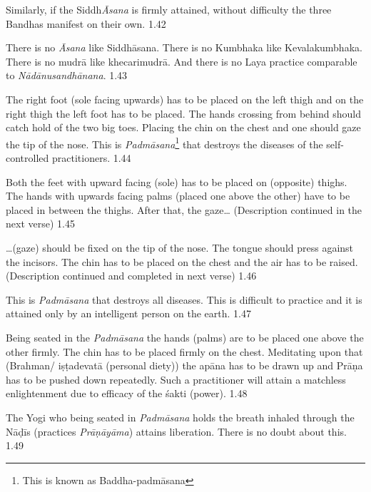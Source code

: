 Similarly, if the Siddh\textit{Āsana} is firmly attained, without difficulty the three Bandhas manifest on their own.   1.42

There is no \textit{Āsana} like Siddhāsana. There is no Kumbhaka like Kevalakumbhaka. There is no mudrā like khecarimudrā. And there is no Laya practice comparable to \textit{Nādānusandhānana}. 1.43
\medskip


The right foot (sole facing upwards) has to be placed on the left thigh and on the right thigh the left foot has to be placed. The hands crossing from behind should catch hold of the two big toes. Placing the chin on the chest and one should gaze the tip of the nose. This is \textit{Padmāsana}\footnote{This is known as Baddha-padmāsana} that destroys the diseases of the self-controlled practitioners. 1.44


Both the feet with upward facing (sole) has to be placed on (opposite) thighs. The hands with upwards facing palms (placed one above the other) have to be placed in between the thighs. After that, the gaze… (Description continued in the next verse) 1.45

…(gaze) should be fixed on the tip of the nose. The tongue should press against the incisors. The chin has to be placed on the chest and the air has to be raised. (Description continued and completed in next verse) 1.46

This is \textit{Padmāsana} that destroys all diseases. This is difficult to practice and it is attained only by an intelligent person on the earth.  1.47


Being seated in the \textit{Padmāsana} the hands (palms) are to be placed one above the other firmly. The chin has to be placed firmly on the chest. Meditating upon that (Brahman/ iṣṭadevatā (personal diety)) the apāna has to be drawn up and Prāṇa has to be pushed down repeatedly. Such a practitioner will attain a matchless enlightenment due to efficacy of the śakti (power). 1.48


The Yogi who being seated in \textit{Padmāsana} holds the breath inhaled through the Nāḍīs (practices \textit{Prāṇāyāma}) attains liberation. There is no doubt about this. 1.49
\medskip


